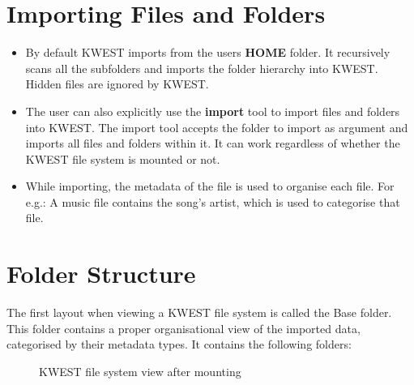 \section{Importing Files and Folders}

\begin{itemize}
\item By default KWEST imports from the users \textbf{HOME} folder. It recursively scans all the subfolders and imports the folder hierarchy into KWEST. Hidden files are ignored by KWEST.

\item The user can also explicitly use the \textbf{import} tool to import files and folders into KWEST. The import tool accepts the folder to import as argument and imports all files and folders within it. It can work regardless of whether the KWEST file system is mounted or not.

\item While importing, the metadata of the file is used to organise each file. For e.g.: A music file contains the song's artist, which is used to categorise that file.
\end{itemize}

\section{Folder Structure}

The first layout when viewing a KWEST file system is called the Base folder. This folder contains a proper organisational view of the imported data, categorised by their metadata types. It contains the following folders:

\begin{figure}[htb]
\centering
\setlength\fboxsep{0pt}
\setlength\fboxrule{0.5pt}
\caption{KWEST file system view after mounting}
\label{fig:dfd0}
\end{figure}

